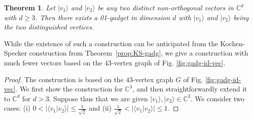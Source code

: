 \documentclass[twocolumn, a4paper, superscriptaddress,nofootinbib, accepted=2020-08-07, hyperref]{quantumarticle}
\newtheorem{theorem}{Theorem}
\begin{document}
\begin{theorem}
	\label{prop:fin-gadg-const}
	Let $|v_1 \rangle$ and $|v_2 \rangle$ be any two distinct non-orthogonal vectors in $\mathbb{C}^d$ with $d \geq 3$. Then there exists a 01-gadget in dimension $d$ with $|v_1 \rangle$ and $|v_2 \rangle$ being the two distinguished vertices.
\end{theorem}   
While the existence of such a construction can be anticipated from the Kochen-Specker construction from Theorem~\ref{prop:KS-gadg}, we give a construction with much fewer vectors based on the $43$-vertex graph of Fig. \ref{fig:gadg-id-vec}.
\begin{proof}
The construction is based on the $43$-vertex graph $G$ of Fig. \ref{fig:gadg-id-vec}. We first show the construction for $\mathbb{C}^3$, and then straightforwardly extend it to $\mathbb{C}^d$ for $d > 3$. Suppose thus that we are given $|v_1 \rangle, |v_2 \rangle \in \mathbb{C}^3$. We consider two cases: (i) $0 < | \langle v_1 | v_2 \rangle| \leq \frac{1}{\sqrt{2}}$ and (ii)  $\frac{1}{\sqrt{2}} < | \langle v_1 | v_2 \rangle| \leq 1$. 
	

\end{proof}
\end{document}
